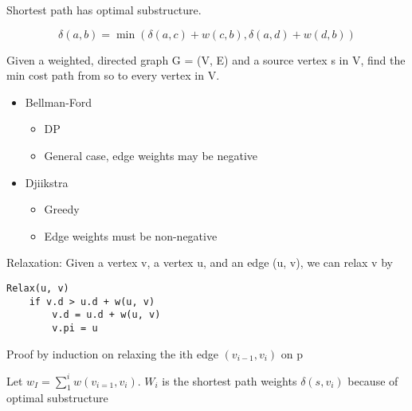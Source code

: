 \documentclass{article}
\begin{document}
Shortest path has optimal substructure.

\begin{equation*}
    \delta(a, b) = \min(\delta(a, c) + w(c, b), \delta(a, d) + w(d, b))
\end{equation*}

Given a weighted, directed graph G = (V, E) and a source vertex s in V, find the
min cost path from so to every vertex in V.

\begin{itemize}
    \item Bellman-Ford
    \begin{itemize}
        \item DP
        \item General case, edge weights may be negative
    \end{itemize}
    \item Djiikstra
    \begin{itemize}
        \item Greedy
        \item Edge weights must be non-negative
    \end{itemize}
\end{itemize}

Relaxation: Given a vertex v, a vertex u, and an edge (u, v), we can relax v by

\begin{verbatim}
Relax(u, v)
    if v.d > u.d + w(u, v)
        v.d = u.d + w(u, v)
        v.pi = u
\end{verbatim}

Proof by induction on relaxing the ith edge \((v_{i-1}, v_i)\) on p

Let \(w_I = \sum_{1}^{i} w(v_{i=1}, v_i)\). \(W_i\) is the shortest path weights
\(\delta(s, v_i)\) because of optimal substructure
\end{document}
